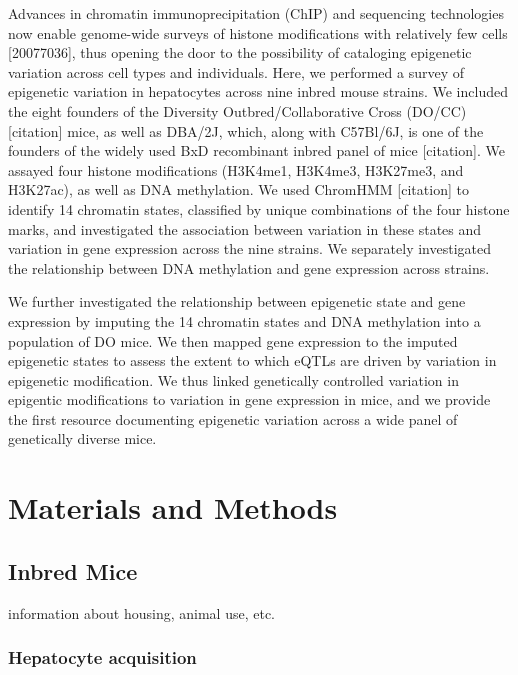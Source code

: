 \documentclass[10pt,letterpaper]{article}
\begin{document}
Advances in chromatin immunoprecipitation (ChIP) and sequencing
technologies now enable genome-wide surveys of histone modifications
with relatively few cells {[}20077036{]}, thus opening the door to the
possibility of cataloging epigenetic variation across cell types and
individuals. Here, we performed a survey of epigenetic variation in
hepatocytes across nine inbred mouse strains. We included the eight
founders of the Diversity Outbred/Collaborative Cross (DO/CC)
{[}citation{]} mice, as well as DBA/2J, which, along with C57Bl/6J, is
one of the founders of the widely used BxD recombinant inbred panel of
mice {[}citation{]}. We assayed four histone modifications (H3K4me1,
H3K4me3, H3K27me3, and H3K27ac), as well as DNA methylation. We used
ChromHMM {[}citation{]} to identify 14 chromatin states, classified by
unique combinations of the four histone marks, and investigated the
association between variation in these states and variation in gene
expression across the nine strains. We separately investigated the
relationship between DNA methylation and gene expression across strains.

We further investigated the relationship between epigenetic state and
gene expression by imputing the 14 chromatin states and DNA methylation
into a population of DO mice. We then mapped gene expression to the
imputed epigenetic states to assess the extent to which eQTLs are driven
by variation in epigenetic modification. We thus linked genetically
controlled variation in epigentic modifications to variation in gene
expression in mice, and we provide the first resource documenting
epigenetic variation across a wide panel of genetically diverse mice.

\hypertarget{materials-and-methods}{%
\section{Materials and Methods}\label{materials-and-methods}}

\hypertarget{inbred-mice}{%
\subsection{Inbred Mice}\label{inbred-mice}}

information about housing, animal use, etc.

\hypertarget{hepatocyte-acquisition}{%
\subsubsection{Hepatocyte acquisition}\label{hepatocyte-acquisition}}
\end{document}
